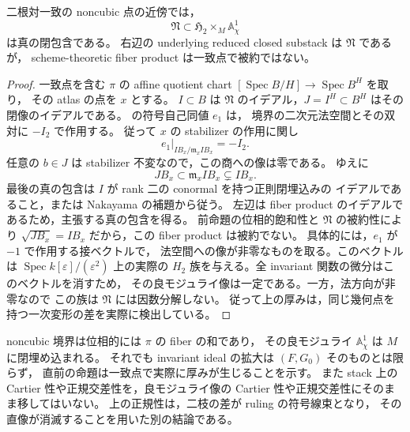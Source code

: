 \begin{proposition}
\label{prop:qa-noncubic-good-image-noncartesian}
二根対一致の noncubic 点の近傍では，
\[
 \mathfrak N\subset
 \mathfrak H_2\times_M\mathbb A^1_\chi
\]
は真の閉包含である。
右辺の underlying reduced closed substack は $\mathfrak N$ であるが，
scheme-theoretic fiber product は一致点で被約ではない。
\end{proposition}
\begin{proof}
一致点を含む $\pi$ の affine quotient chart
$[\operatorname{Spec}B/H]\to\operatorname{Spec}B^H$ を取り，
その atlas の点を $x$ とする。
$I\subset B$ は $\mathfrak N$ のイデアル，$J=I^H\subset B^H$
はその閉像のイデアルである。
\cite[\texttt{prop:noncubic-coincident-full-normal-representation}]
{QuadricModuli2026} の符号自己同値 $e_1$ は，
境界の二次元法空間とその双対に $-I_2$ で作用する。
従って $x$ の stabilizer の作用に関し
\[
 e_1|_{I B_x/\mathfrak m_x I B_x}=-I_2.
\]
任意の $b\in J$ は stabilizer 不変なので，この商への像は零である。
ゆえに
\[
 J B_x\subset\mathfrak m_x I B_x\subsetneq I B_x.
\]
最後の真の包含は $I$ が rank 二の conormal を持つ正則閉埋込みの
イデアルであること，または Nakayama の補題から従う。
左辺は fiber product のイデアルであるため，主張する真の包含を得る。
前命題の位相的飽和性と $\mathfrak N$ の被約性により
$\sqrt{J B_x}=I B_x$ だから，この fiber product は被約でない。
具体的には，$e_1$ が $-1$ で作用する接ベクトルで，
法空間への像が非零なものを取る。このベクトルは
$\operatorname{Spec}k[\varepsilon]/(\varepsilon^2)$ 上の実際の
$H_2$ 族を与える。全 invariant 関数の微分はこのベクトルを消すため，
その良モジュライ像は一定である。一方，法方向が非零なので
この族は $\mathfrak N$ には因数分解しない。
従って上の厚みは，同じ幾何点を持つ一次変形の差を実際に検出している。
\end{proof}

\begin{remark}[閉像と引戻しの区別]
noncubic 境界は位相的には $\pi$ の fiber の和であり，
その良モジュライ $\mathbb A^1_\chi$ は $M$ に閉埋め込まれる。
それでも invariant ideal の拡大は $(F,G_0)$ そのものとは限らず，
直前の命題は一致点で実際に厚みが生じることを示す。
また stack 上の Cartier 性や正規交差性を，良モジュライ像の
Cartier 性や正規交差性にそのまま移してはいない。
上の正規性は，二枝の差が ruling の符号線束となり，
その直像が消滅することを用いた別の結論である。
\end{remark}
